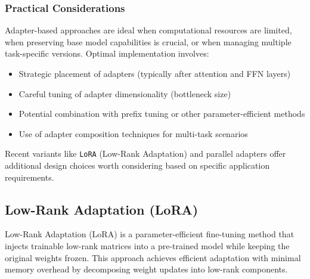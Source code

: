 \subsubsection{Practical Considerations}
Adapter-based approaches are ideal when computational resources are limited, when preserving base model capabilities is crucial, or when managing multiple task-specific versions. Optimal implementation involves:
\begin{itemize}
\item Strategic placement of adapters (typically after attention and FFN layers)
\item Careful tuning of adapter dimensionality (bottleneck size)
\item Potential combination with prefix tuning or other parameter-efficient methods
\item Use of adapter composition techniques for multi-task scenarios
\end{itemize}
Recent variants like \texttt{LoRA} (Low-Rank Adaptation) and parallel adapters offer additional design choices worth considering based on specific application requirements.

\subsection{Low-Rank Adaptation (LoRA)}

Low-Rank Adaptation (LoRA) is a parameter-efficient fine-tuning method that injects trainable low-rank matrices into a pre-trained model while keeping the original weights frozen. This approach achieves efficient adaptation with minimal memory overhead by decomposing weight updates into low-rank components.

